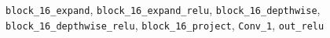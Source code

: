 \texttt{block\_16\_expand}, \texttt{block\_16\_expand\_relu}, \texttt{block\_16\_depthwise}, \texttt{block\_16\_depthwise\_relu}, \texttt{block\_16\_project}, \texttt{Conv\_1}, \texttt{out\_relu}
